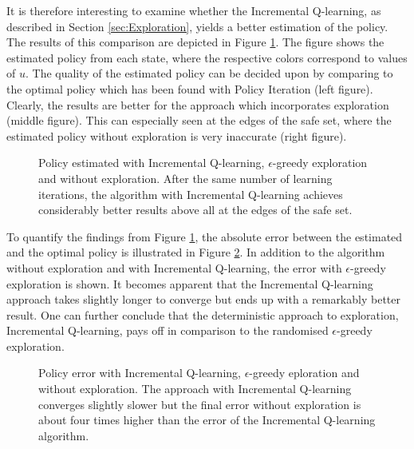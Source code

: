 \documentclass[../main.tex]{subfiles}
\begin{document}
It is therefore interesting to examine whether the Incremental Q-learning, as described in Section \ref{sec:Exploration}, yields a better estimation of the policy. The results of this comparison are depicted in Figure \ref{fig:policy_exploration}. The figure shows the estimated policy from each state, where the respective colors correspond to values of $u$. The quality of the estimated policy can be decided upon by comparing to the optimal policy which has been found with Policy Iteration (left figure). Clearly, the results are better for the approach which incorporates exploration (middle figure). This can especially seen at the edges of the safe set, where the estimated policy without exploration is very inaccurate (right figure).

\begin{figure}[H]
    \centering
    \caption{Policy estimated with Incremental Q-learning, $\epsilon$-greedy exploration and without exploration. After the same number of learning iterations, the algorithm with Incremental Q-learning achieves considerably better results above all at the edges of the safe set.} \label{fig:policy_exploration}
\end{figure}

To quantify the findings from Figure \ref{fig:policy_exploration}, the absolute error between the estimated and the optimal policy is illustrated in Figure \ref{fig:PolicyError}. In addition to the algorithm without exploration and with Incremental Q-learning, the error with $\epsilon$-greedy exploration is shown. It becomes apparent that the Incremental Q-learning approach takes slightly longer to converge but ends up with a remarkably better result. One can further conclude that the deterministic approach to exploration, Incremental Q-learning, pays off in comparison to the randomised $\epsilon$-greedy exploration. 

\begin{figure}[H]
    \centering
    \caption{Policy error with Incremental Q-learning, $\epsilon$-greedy eploration and without exploration. The approach with Incremental Q-learning converges slightly slower but the final error without exploration is about four times higher than the error of the Incremental Q-learning algorithm.} \label{fig:PolicyError}
\end{figure}
\end{document}
